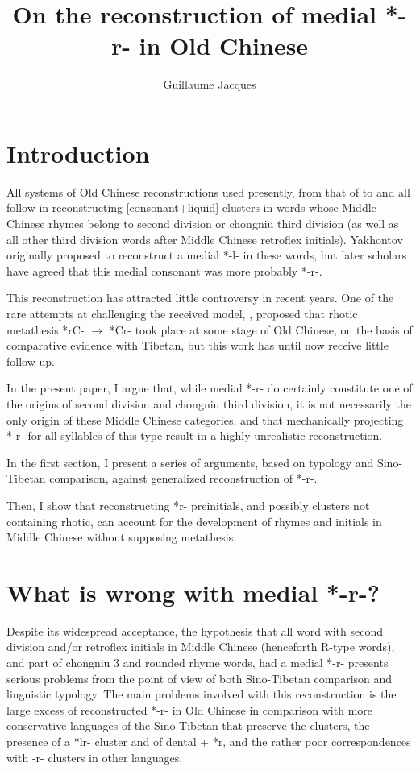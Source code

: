 \documentclass[oldfontcommands,oneside,a4paper,11pt]{article}
\newcommand{\ipa}[1]{{\phon \mbox{#1}}} %
\newcommand{\change}[2]{*\ipa{#1} $\rightarrow$ \ipa{#2}}
\begin{document}
 
\title{On the reconstruction of medial *-r- in Old Chinese}
\author{Guillaume Jacques}
\maketitle
 

\section{Introduction}
All systems of Old Chinese reconstructions used  presently, from that of \citealt{li71oc} to \citet{schuessler09minimal} and \citet{bs14oc} all follow \citet{yakhontov61sochetaniya} in reconstructing [consonant+liquid] clusters in words whose Middle Chinese rhymes belong to second division or chongniu third division (as well as all other third division words after Middle Chinese retroflex initials). Yakhontov originally proposed to reconstruct a medial *\ipa{-l-} in these words, but later scholars have agreed that this medial consonant was more probably *\ipa{-r-}.

This reconstruction has attracted little controversy in recent years. One of the rare attempts at challenging the received model,  \citet{handel02r}, proposed that rhotic metathesis \change{rC-}{*Cr-}  took place at some stage of Old Chinese, on the basis of comparative evidence with Tibetan, but this work has until now receive little follow-up.

In the present paper, I argue that, while medial *\ipa{-r-} do certainly constitute one of the origins of  second division and chongniu third division, it is not necessarily the only origin of these Middle Chinese categories, and that mechanically projecting *\ipa{-r-} for all syllables of this type result in a highly unrealistic reconstruction.

In the first section, I present a series of arguments, based on typology and Sino-Tibetan comparison, against generalized reconstruction of *\ipa{-r-}.

Then, I show that reconstructing *\ipa{r-} preinitials, and possibly clusters not containing rhotic, can account for the development of rhymes and initials in Middle Chinese without supposing metathesis.

\section{What is wrong with medial *\ipa{-r-}?} \label{sec:medial}
Despite its widespread acceptance, the hypothesis that all word with second division and/or retroflex initials in Middle Chinese (henceforth R-type words), and part of chongniu 3 and rounded rhyme words, had a medial *\ipa{-r-} presents serious problems from the point of view of both Sino-Tibetan comparison and linguistic typology. The main problems involved with this reconstruction is the large excess of reconstructed *\ipa{-r-} in Old Chinese in comparison with more conservative languages of the Sino-Tibetan that preserve the clusters, the presence of a *\ipa{lr-} cluster and of dental + *\ipa{r}, and the rather poor correspondences with \ipa{-r-} clusters in other languages.
\end{document}
